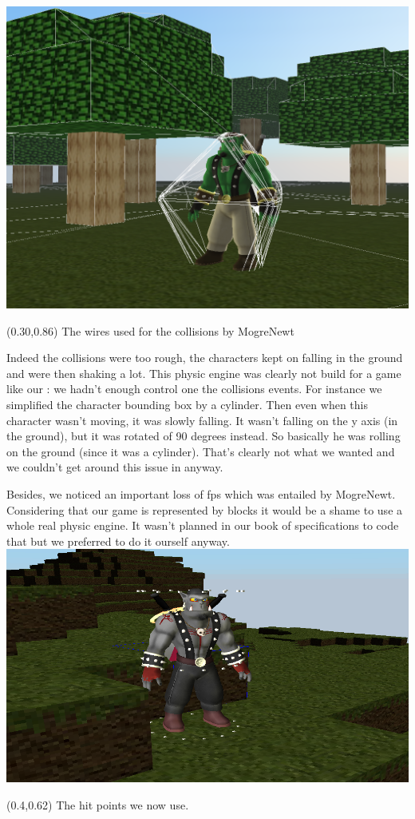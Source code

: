 \documentclass[article]{report}         %
\begin{document}
  \includegraphics[width=15cm]{images/Physics/MogreNewtWires.png}
\begin{textblock}{0.4}(0.30,0.86)
The wires used for the collisions by MogreNewt
\end{textblock}
\newpage
 Indeed the collisions were too rough, the characters kept on falling in the ground and were then shaking a lot.
This physic engine was clearly not build for a game like our : we hadn't enough control one the collisions events. For instance we simplified the character bounding box by a cylinder.
Then even when this character wasn't moving, it was slowly falling. It wasn't falling on the y axis (in the ground), but it was rotated of 90 degrees instead. So basically he was rolling on the ground (since it was a cylinder).
That's clearly not what we wanted and we couldn't get around this issue in anyway.

Besides, we noticed an important loss of fps which was entailed by MogreNewt. Considering that our game is represented by blocks it would be a shame to use a whole real physic engine. It wasn't planned in our book of specifications to code that but we preferred to do it ourself anyway.\\

\bigskip
  \includegraphics[width=16cm]{images/Physics/HitPoints.png}
\begin{textblock}{0.4}(0.4,0.62)
The hit points we now use.
\end{textblock}
\end{document}
